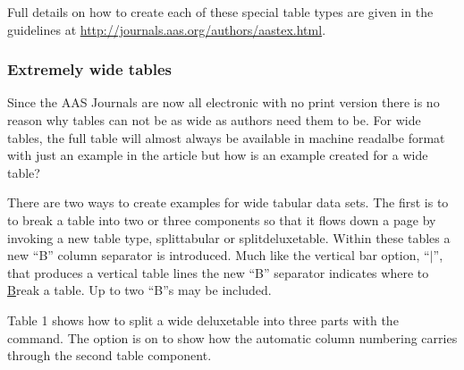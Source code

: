 \documentclass[linenumbers,trackchanges]{aastex7}
\begin{document}
Full details on how to create each of these special table types are given in the guidelines at \url{http://journals.aas.org/authors/aastex.html}.

\subsubsection{Extremely wide tables}

Since the AAS Journals are now all electronic with no print version there is no reason why tables can not be as wide as authors need them to be. For wide tables, the full table will almost always be available in machine readalbe format with just an example in the article but how is an example created for a wide table?

There are two ways to create examples for wide tabular data sets. The first is to to break a table into two or three components so that it flows down a page by invoking a new table type, splittabular or splitdeluxetable. Within these tables a new ``B'' column separator is introduced.  Much like the vertical bar option, ``$\vert$'', that produces a vertical table lines the new ``B'' separator indicates where to \underline{B}reak a table.  Up to two ``B''s may be included.

Table 1 shows how to split a wide deluxetable into three parts with
the {\tt\string\splitdeluxetable} command.  The {\tt\string\colnumbers}
option is on to show how the automatic column numbering carries through the
second table component.
\end{document}
